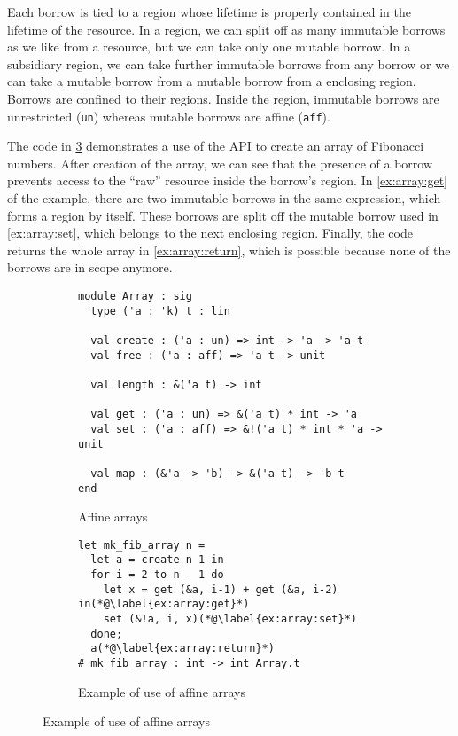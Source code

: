 Each borrow is tied to a region whose lifetime is properly
contained in the lifetime of the resource. 
In a region, we can split off as many immutable borrows as we like
from a resource, but we can take only one mutable borrow. In a
subsidiary region, we can take further immutable borrows from any
borrow or we can take a mutable borrow from a mutable borrow from a
enclosing region. Borrows are confined to their regions. Inside the region,
immutable borrows are unrestricted (\lstinline/un/) whereas mutable
borrows are affine (\lstinline/aff/).

The code in \cref{ex:array} demonstrates a use of the API to create an
array of Fibonacci numbers. After creation of the array, we can see
that the presence of a borrow prevents access to the ``raw'' 
resource inside the borrow's region. In \cref{ex:array:get} of the
example, there are two immutable borrows in the same
expression, which forms a region by itself. These borrows are split
off the mutable borrow used in \cref{ex:array:set}, which belongs to
the next enclosing region.
Finally, the code returns the whole array in \cref{ex:array:return},
which is possible because none of the borrows are in scope anymore.

\begin{figure}[tp]
  \centering
  \begin{subfigure}{0.48\linewidth}
\begin{lstlisting}
module Array : sig
  type ('a : 'k) t : lin
  
  val create : ('a : un) => int -> 'a -> 'a t
  val free : ('a : aff) => 'a t -> unit

  val length : &('a t) -> int

  val get : ('a : un) => &('a t) * int -> 'a
  val set : ('a : aff) => &!('a t) * int * 'a -> unit
  
  val map : (&'a -> 'b) -> &('a t) -> 'b t
end
\end{lstlisting}
    \caption{Affine arrays}
    \label{sig:array}
  \end{subfigure}\hfill
  \begin{subfigure}{0.5\linewidth}
\begin{lstlisting}
let mk_fib_array n =
  let a = create n 1 in
  for i = 2 to n - 1 do
    let x = get (&a, i-1) + get (&a, i-2) in(*@\label{ex:array:get}*)
    set (&!a, i, x)(*@\label{ex:array:set}*)
  done;
  a(*@\label{ex:array:return}*)
# mk_fib_array : int -> int Array.t
\end{lstlisting}
    \caption{Example of use of affine arrays}
    \label{ex:array}
  \end{subfigure}
\end{figure}


